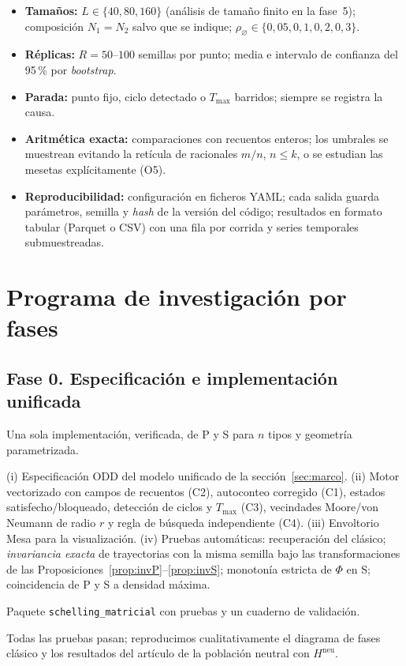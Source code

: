 \documentclass[11pt,a4paper]{article}
\theoremstyle{plain}
\theoremstyle{definition}
\theoremstyle{remark}
\newcommand{\vac}{\varnothing}
\newcommand{\modP}{\textsf{P}}
\newcommand{\modS}{\textsf{S}}
\newenvironment{fase}[1]{\subsection*{#1}\begin{description}[leftmargin=0pt,itemsep=2pt]}{\end{description}}
\begin{document}
\begin{itemize}
  \item \textbf{Tamaños:} $L\in\{40,80,160\}$ (análisis de tamaño finito en la
  fase~5); composición $N_1=N_2$ salvo que se indique; $\rho_\vac\in\{0{,}05,
  0{,}1,0{,}2,0{,}3\}$.
  \item \textbf{Réplicas:} $R=50$--$100$ semillas por punto; media e
  intervalo de confianza del 95\,\% por \emph{bootstrap}.
  \item \textbf{Parada:} punto fijo, ciclo detectado o $T_{\max}$ barridos;
  siempre se registra la causa.
  \item \textbf{Aritmética exacta:} comparaciones con recuentos enteros; los
  umbrales se muestrean evitando la retícula de racionales $m/n$, $n\le k$, o se
  estudian las mesetas explícitamente (O5).
  \item \textbf{Reproducibilidad:} configuración en ficheros YAML; cada salida
  guarda parámetros, semilla y \emph{hash} de la versión del código; resultados en
  formato tabular (Parquet o CSV) con una fila por corrida y series temporales
  submuestreadas.
\end{itemize}

\section{Programa de investigación por fases}
\label{sec:programa}

\begin{fase}{Fase 0. Especificación e implementación unificada}
\item[Objetivo.] Una sola implementación, verificada, de \modP{} y \modS{} para
$n$ tipos y geometría parametrizada.
\item[Tareas.] (i) Especificación ODD \cite{Grimm2020} del modelo unificado de
la sección~\ref{sec:marco}. (ii) Motor vectorizado con campos de recuentos
(C2), autoconteo corregido (C1), estados satisfecho/bloqueado, detección de
ciclos y $T_{\max}$ (C3), vecindades Moore/von Neumann de radio $r$ y regla de
búsqueda independiente (C4). (iii) Envoltorio Mesa para la visualización.
(iv) Pruebas automáticas: recuperación del clásico; \emph{invariancia exacta}
de trayectorias con la misma semilla bajo las transformaciones de las
Proposiciones~\ref{prop:invP}--\ref{prop:invS}; monotonía estricta de $\Phi$ en
\modS; coincidencia de \modP{} y \modS{} a densidad máxima.
\item[Entregable.] Paquete \texttt{schelling\_matricial} con pruebas y un
cuaderno de validación.
\item[Cierre.] Todas las pruebas pasan; reproducimos cualitativamente el
diagrama de fases clásico \cite{Gauvin2009} y los resultados del artículo de
la población neutral con $H^{\mathrm{neu}}$.
\end{fase}
\end{document}
